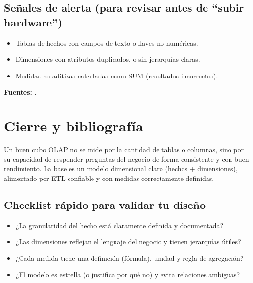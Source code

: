 \documentclass[12pt]{article}
\begin{document}
\subsection*{Señales de alerta (para revisar antes de ``subir hardware'')}
\begin{itemize}[leftmargin=*, itemsep=0.25em]
  \item Tablas de hechos con campos de texto o llaves no numéricas.
  \item Dimensiones con atributos duplicados, o sin jerarquías claras.
  \item Medidas no aditivas calculadas como SUM (resultados incorrectos).
\end{itemize}

\noindent\textbf{Fuentes:} \cite{kimballgroup_star_olap, mslearn_star_schema_powerbi, mslearn_tabular_performance}.

\section{Cierre y bibliografía}
Un buen cubo OLAP no se mide por la cantidad de tablas o columnas, sino por su capacidad de responder preguntas del negocio de forma consistente y con buen rendimiento. La base es un modelo dimensional claro (hechos + dimensiones), alimentado por ETL confiable y con medidas correctamente definidas.

\subsection*{Checklist rápido para validar tu diseño}
\begin{itemize}[leftmargin=*, itemsep=0.25em]
  \item ¿La granularidad del hecho está claramente definida y documentada?
  \item ¿Las dimensiones reflejan el lenguaje del negocio y tienen jerarquías útiles?
  \item ¿Cada medida tiene una definición (fórmula), unidad y regla de agregación?
  \item ¿El modelo es estrella (o justifica por qué no) y evita relaciones ambiguas?
\end{itemize}

\nocite{*}
\printbibliography
\end{document}
